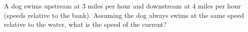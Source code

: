 A dog swims upstream at $3$ miles per hour and downstream at $4$ miles per hour (speeds relative to the bank). Assuming the dog always swims at the same speed relative to the water, what is the speed of the current?
